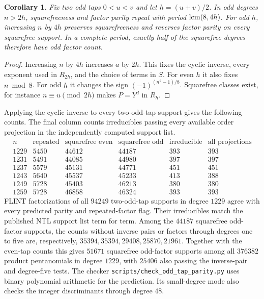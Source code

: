 \documentclass[11pt]{article}
\newtheorem{corollary}[theorem]{Corollary}
\begin{document}
\begin{corollary}\label{cor:odd-tap-period}
Fix two odd taps \(0<u<v\) and let \(h=(u+v)/2\).
In odd degrees \(n>2h\), squarefreeness and factor parity repeat
with period \(\mathop{\rm lcm}(8,4h)\). For odd \(h\), increasing
\(n\) by \(4h\) preserves squarefreeness and reverses factor parity
on every squarefree support. In a complete period, exactly half
of the squarefree degrees therefore have odd factor count.
\end{corollary}
\begin{proof}
Increasing \(n\) by \(4h\) increases \(a\) by \(2h\). This fixes
the cyclic inverse, every exponent used in \(R_{2h}\), and the choice
of terms in \(S\). For even \(h\) it also fixes \(n\bmod 8\).
For odd \(h\) it changes the sign \((-1)^{(n^2-1)/8}\).
Squarefree classes exist, for instance \(n\equiv u\pmod{2h}\)
makes \(P=Y^d\) in \(R_h\).
\end{proof}

Applying the cyclic inverse to every two-odd-tap support gives the
following counts. The final column counts irreducibles passing every
available order projection in the independently computed support list.
\[
\begin{array}{r|r|r|r|r|r}
n&\text{repeated}&\text{squarefree even}&\text{squarefree odd}&
  \text{irreducible}&\text{all projections}\\\hline
1229&5450&44612&44187&393&393\\
1231&5491&44085&44980&397&397\\
1237&5579&45131&44771&451&451\\
1243&5640&45537&45233&413&388\\
1249&5728&45403&46213&380&380\\
1259&5728&46858&46324&393&393
\end{array}
\]
FLINT factorizations of all \(94249\) two-odd-tap supports in degree
\(1229\) agree with every predicted parity and repeated-factor flag.
Their irreducibles match the published NTL support list term for term.
Among the \(44187\) squarefree odd-factor supports, the counts without
inverse pairs or factors through degrees one to five are, respectively,
\(35394,35394,29408,25870,21961\).
Together with the even-tap counts this gives \(51671\) squarefree
odd-factor supports among all \(376382\) product pentanomials in
degree \(1229\), with \(25406\) also passing the inverse-pair and
degree-five tests. The checker \nolinkurl{scripts/check_odd_tap_parity.py}
uses binary polynomial arithmetic for the prediction. Its small-degree
mode also checks the integer discriminants through degree \(48\).
\end{document}
